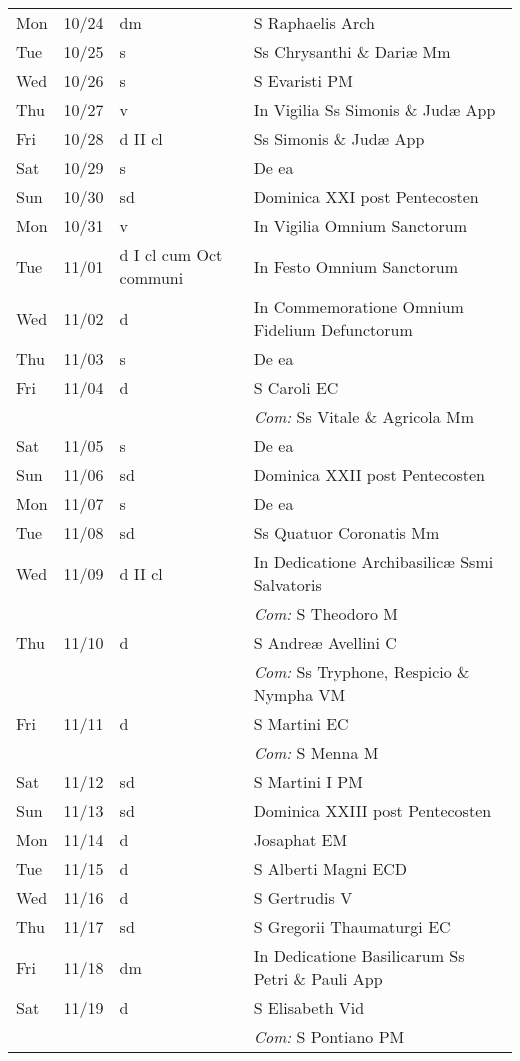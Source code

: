 \documentclass[10pt]{article}
\begin{document}
\begin{longtable}{ l l l l }
Mon & 10/24 & dm & S Raphaelis Arch\\
Tue & 10/25 & s & Ss Chrysanthi \& Dariæ Mm\\
Wed & 10/26 & s & S Evaristi PM\\
Thu & 10/27 & v & In Vigilia Ss Simonis \& Judæ App\\
Fri & 10/28 & d II cl & Ss Simonis \& Judæ App\\
Sat & 10/29 & s & De ea\\
Sun & 10/30 & sd & Dominica XXI post Pentecosten\\
Mon & 10/31 & v & In Vigilia Omnium Sanctorum\\
Tue & 11/01 & d I cl cum Oct communi & In Festo Omnium Sanctorum\\
Wed & 11/02 & d & In Commemoratione Omnium Fidelium Defunctorum\\
Thu & 11/03 & s & De ea\\
Fri & 11/04 & d & S Caroli EC\\
 & & & \textit{Com:} Ss Vitale \& Agricola Mm\\
Sat & 11/05 & s & De ea\\
Sun & 11/06 & sd & Dominica XXII post Pentecosten\\
Mon & 11/07 & s & De ea\\
Tue & 11/08 & sd & Ss Quatuor Coronatis Mm\\
Wed & 11/09 & d II cl & In Dedicatione Archibasilicæ Ssmi Salvatoris\\
 & & & \textit{Com:} S Theodoro M\\
Thu & 11/10 & d & S Andreæ Avellini C\\
 & & & \textit{Com:} Ss Tryphone, Respicio \& Nympha VM\\
Fri & 11/11 & d & S Martini  EC\\
 & & & \textit{Com:} S Menna M\\
Sat & 11/12 & sd & S Martini I PM\\
Sun & 11/13 & sd & Dominica XXIII post Pentecosten\\
Mon & 11/14 & d & Josaphat EM\\
Tue & 11/15 & d & S Alberti Magni ECD\\
Wed & 11/16 & d & S Gertrudis V\\
Thu & 11/17 & sd & S Gregorii Thaumaturgi EC\\
Fri & 11/18 & dm & In Dedicatione Basilicarum Ss Petri \& Pauli App\\
Sat & 11/19 & d & S Elisabeth Vid\\
 & & & \textit{Com:} S Pontiano PM\\

\end{longtable}
\end{document}
